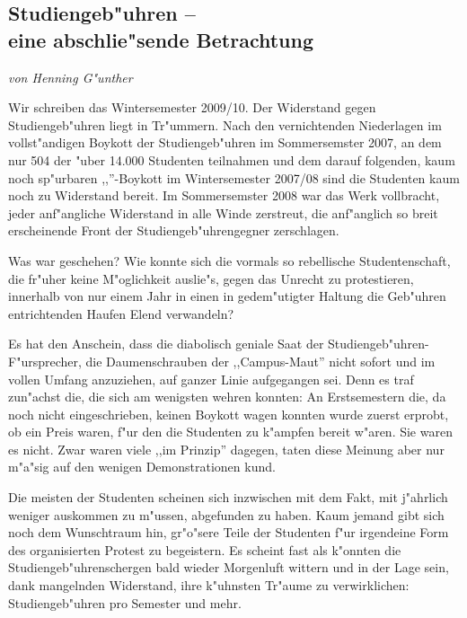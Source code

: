 \subsection[Studiengeb"uhren]{Studiengeb"uhren --\\ eine abschlie"sende
Betrachtung}
\emph{von Henning G"unther}


Wir schreiben das Wintersemester 2009/10.
Der Widerstand gegen Studiengeb"uhren liegt in Tr"ummern.
Nach den vernichtenden Niederlagen im voll\-st"an\-di\-gen Boykott der
Studiengeb"uhren im Sommersemster 2007, an dem nur 504 der "uber 14.000 Studenten teilnahmen und dem darauf folgenden, kaum noch sp"urbaren ,,''-Boykott im Wintersemester 2007/08 sind die Studenten kaum noch zu Widerstand bereit. Im Sommersemster 2008 war das Werk vollbracht, jeder anf"angliche Widerstand in alle Winde zerstreut, die anf"anglich so breit erscheinende Front der Studiengeb"uhrengegner zerschlagen.

Was war geschehen?
Wie konnte sich die vormals so rebellische Studentenschaft, die fr"uher keine M"oglichkeit auslie"s, gegen das Unrecht zu protestieren, innerhalb von nur einem Jahr in einen in gedem"utigter Haltung die Geb"uhren entrichtenden Haufen Elend verwandeln?

Es hat den Anschein, dass die diabolisch geniale Saat der
Studiengeb"uhren-F"ursprecher, die Daumenschrauben der ,,Campus-Maut'' nicht
sofort und im vollen Umfang anzuziehen, auf ganzer Linie aufgegangen sei. Denn es traf zun"achst die, die sich am wenigsten wehren konnten: An Erstsemestern die, da noch nicht eingeschrieben, keinen Boykott wagen
konnten wurde zuerst erprobt, ob  ein Preis waren, f"ur den die Studenten zu k"ampfen bereit w"aren. Sie waren es nicht.
Zwar waren viele ,,im Prinzip'' dagegen, taten diese Meinung aber nur m"a"sig
auf den wenigen Demonstrationen kund.

Die meisten der Studenten scheinen sich inzwischen mit dem Fakt, mit j"ahrlich
 weniger auskommen zu m"ussen, abgefunden zu haben. Kaum jemand gibt sich noch dem Wunschtraum hin, gr"o"sere Teile der Studenten f"ur irgendeine Form des organisierten Protest zu begeistern.
Es scheint fast als k"onnten die Studiengeb"uhrenschergen bald wieder Morgenluft wittern und in der Lage sein, dank mangelnden Widerstand, ihre k"uhnsten Tr"aume zu verwirklichen:  Studiengeb"uhren pro Semester und mehr.

